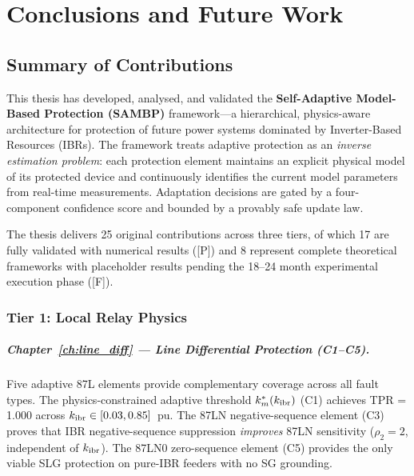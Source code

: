 \chapter{Conclusions and Future Work}
\label{ch:conclusions}

\section{Summary of Contributions}
\label{sec:ch13_summary}

This thesis has developed, analysed, and validated the \textbf{Self-Adaptive
Model-Based Protection (SAMBP)} framework---a hierarchical, physics-aware
architecture for protection of future power systems dominated by
Inverter-Based Resources (IBRs). The framework treats adaptive protection
as an \emph{inverse estimation problem}: each protection element maintains
an explicit physical model of its protected device and continuously
identifies the current model parameters from real-time measurements.
Adaptation decisions are gated by a four-component confidence score and
bounded by a provably safe update law.

The thesis delivers 25 original contributions across three tiers, of
which 17 are fully validated with numerical results ([P]) and 8 represent
complete theoretical frameworks with placeholder results pending the
18--24 month experimental execution phase ([F]).

\subsection{Tier 1: Local Relay Physics}

\paragraph{Chapter~\ref{ch:line_diff} --- Line Differential Protection (C1--C5).}
Five adaptive 87L elements provide complementary coverage across all
fault types. The physics-constrained adaptive threshold $k_m^*(k_\mathrm{ibr})$
(C1) achieves TPR = 1.000 across $k_\mathrm{ibr} \in [0.03, 0.85]$~pu. The
87LN negative-sequence element (C3) proves that IBR negative-sequence
suppression \emph{improves} 87LN sensitivity ($\rho_2 = 2$, independent
of $k_\mathrm{ibr}$). The 87LN0 zero-sequence element (C5) provides the only
viable SLG protection on pure-IBR feeders with no SG grounding.

